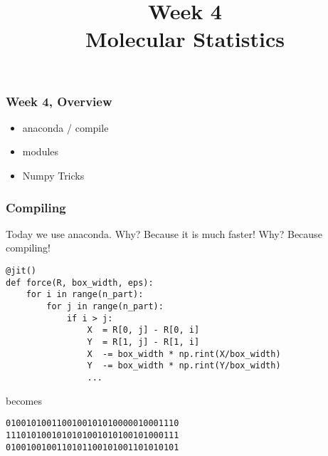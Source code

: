 

\usepackage{soul}

\title[]{Week 4\\Molecular Statistics}








{
\usebackgroundtemplate{}
\begin{frame}[plain]
    \titlepage
    \addtocounter{framenumber}{-1}
\end{frame}
}

\begin{frame}[fragile]

    \frametitle{Week 4, Overview}

    \begin{itemize}

        \item anaconda / compile

        \item modules

        \item Numpy Tricks


    \end{itemize}

\end{frame}


\begin{frame}[fragile]

    \frametitle{Compiling}

    Today we use anaconda. Why?\newline
    Because it is much faster! Why?\newline
    Because compiling!

\begin{lstlisting}
@jit()
def force(R, box_width, eps):
    for i in range(n_part):
        for j in range(n_part):
            if i > j:
                X  = R[0, j] - R[0, i]
                Y  = R[1, j] - R[1, i]
                X  -= box_width * np.rint(X/box_width)
                Y  -= box_width * np.rint(Y/box_width)
                ...
\end{lstlisting}

    becomes

\begin{lstlisting}
0100101001100100101010000010001110
1110101001010101001010100101000111
0100100100110101100101001101010101
\end{lstlisting}


\end{frame}


